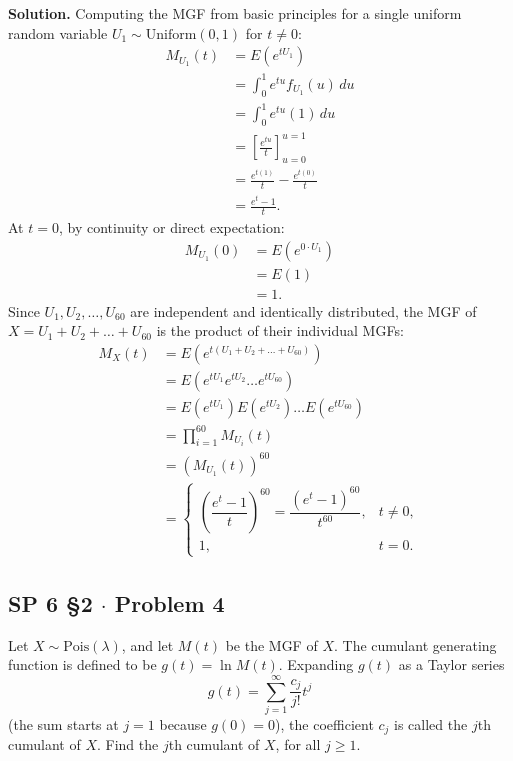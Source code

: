 \documentclass[11pt,a4paper]{article}
\begin{document}
\noindent \textbf{Solution.} Computing the MGF from basic principles for a single uniform random variable $U_1 \sim \text{Uniform}(0,1)$ for $t \neq 0$:
\begin{align*}
M_{U_1}(t) &= E\left( e^{t U_1} \right) \\
&= \int_{0}^{1} e^{tu} f_{U_1}(u) \, du \\
&= \int_{0}^{1} e^{tu} (1) \, du \\
&= \left[ \frac{e^{tu}}{t} \right]_{u=0}^{u=1} \\
&= \frac{e^{t(1)}}{t} - \frac{e^{t(0)}}{t} \\
&= \frac{e^t - 1}{t}.
\end{align*}
At $t = 0$, by continuity or direct expectation:
\begin{align*}
M_{U_1}(0) &= E\left( e^{0 \cdot U_1} \right) \\
&= E(1) \\
&= 1.
\end{align*}
Since $U_1, U_2, \dots, U_{60}$ are independent and identically distributed, the MGF of $X = U_1 + U_2 + \dots + U_{60}$ is the product of their individual MGFs:
\begin{align*}
M_X(t) &= E\left( e^{t(U_1 + U_2 + \dots + U_{60})} \right) \\
&= E\left( e^{tU_1} e^{tU_2} \dots e^{tU_{60}} \right) \\
&= E\left(e^{tU_1}\right) E\left(e^{tU_2}\right) \dots E\left(e^{tU_{60}}\right) \\
&= \prod_{i=1}^{60} M_{U_i}(t) \\
&= \left( M_{U_1}(t) \right)^{60} \\
&= \begin{cases}
\left( \dfrac{e^t - 1}{t} \right)^{60} = \dfrac{(e^t - 1)^{60}}{t^{60}}, & t \neq 0, \\[10pt]
1, & t = 0.
\end{cases}
\end{align*}

\vspace{10pt}
\subsection{SP 6 \S2 $\cdot$ Problem 4}
\begin{tcolorbox}[title={SP 6 \S2 $\cdot$ Problem 4}]
Let $X \sim \text{Pois}(\lambda)$, and let $M(t)$ be the MGF of $X$. The cumulant generating function is defined to be $g(t) = \ln M(t)$. Expanding $g(t)$ as a Taylor series
\[
g(t) = \sum_{j=1}^{\infty} \frac{c_j}{j!} t^j
\]
(the sum starts at $j=1$ because $g(0) = 0$), the coefficient $c_j$ is called the $j$th cumulant of $X$. Find the $j$th cumulant of $X$, for all $j \ge 1$.
\end{tcolorbox}
\end{document}
